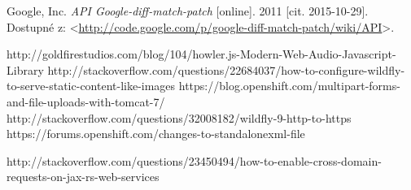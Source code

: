 \documentclass[12pt,oneside]{fithesis2}
\begin{document}
\begin{thebibliography}{59}
  		Google, Inc.
  		\emph{API Google-diff-match-patch}
  		[online].
  		2011
  		[cit. 2015-10-29].
  		Dostupné z: <\url{http://code.google.com/p/google-diff-match-patch/wiki/API}>.
  		
  		http://goldfirestudios.com/blog/104/howler.js-Modern-Web-Audio-Javascript-Library
  		http://stackoverflow.com/questions/22684037/how-to-configure-wildfly-to-serve-static-content-like-images
  		https://blog.openshift.com/multipart-forms-and-file-uploads-with-tomcat-7/
  		http://stackoverflow.com/questions/32008182/wildfly-9-http-to-https
  		https://forums.openshift.com/changes-to-standalonexml-file
  		
  		
  	http://stackoverflow.com/questions/23450494/how-to-enable-cross-domain-requests-on-jax-rs-web-services
  			
	\end{thebibliography}
\end{document}
